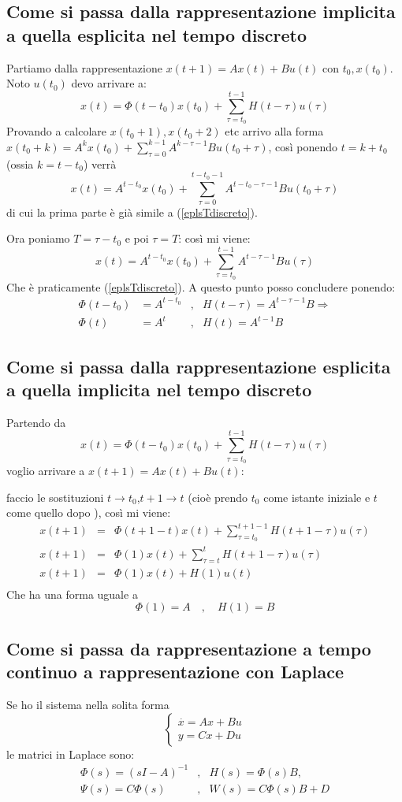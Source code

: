 \documentclass{article}
\begin{document}
\subsection{Come si passa dalla rappresentazione implicita a quella esplicita nel tempo discreto}
Partiamo dalla rappresentazione $x(t+1) = Ax(t)+Bu(t)$ con $t_0,x(t_0)$.
Noto $u(t_0)$ devo arrivare a: 
\begin{equation}\label{eplsTdiscreto}
    x(t) = \Phi(t-t_0)x(t_0)+\sum_{\tau=t_0}^{t-1}H(t-\tau)u(\tau)
\end{equation}
Provando a calcolare $x(t_0+1),x(t_0+2)$ etc arrivo alla forma
$x(t_0+k) = A^kx(t_0)+\sum_{\tau = 0}^{k-1}A^{k-\tau-1}B u(t_0+\tau)$,
così ponendo $t=k+t_0$ (ossia $k=t-t_0$) verrà
\[
x(t) =A^{t-t_0}x(t_0) +\sum_{\tau=0}^{t-t_0-1}A^{t-t_0-\tau-1}B u(t_0+\tau)   
\]
di cui la prima parte è già simile a (\ref{eplsTdiscreto}).

Ora poniamo $T = \tau-t_0$ e poi $\tau=T$: così mi viene:
\[
    x(t) =A^{t-t_0}x(t_0)+\sum_{\tau=t_0}^{t-1}A^{t-\tau-1}Bu(\tau)
\]
Che è praticamente (\ref{eplsTdiscreto}). A questo punto posso concludere ponendo:
\begin{align*}
\Phi(t-t_0)&=A^{t-t_0} &,& H(t-\tau) = A^{t-\tau-1}B \Longrightarrow\\
\Phi(t) &= A^t &,&H(t)= A^{t-1}B
\end{align*}


\subsection{Come si passa dalla rappresentazione esplicita a quella implicita nel tempo discreto}

Partendo da
\[
    x(t) = \Phi(t-t_0)x(t_0)+\sum_{\tau=t_0}^{t-1}H(t-\tau)u(\tau)
\]
voglio arrivare a $x(t+1) = Ax(t)+Bu(t)$: 

faccio le sostituzioni $t\to t_0$,$t+1\to t$ (cioè prendo $t_0$ come istante iniziale e $t$ come quello dopo ),
così mi viene:
\begin{align*}
    x(t+1) &=& \Phi(t+1-t)x(t)+\sum_{\tau=t_0}^{t+1-1}H(t+1-\tau)u(\tau)\\
    x(t+1) &=& \Phi(1)x(t)+\sum_{\tau=t}^{t}H(t+1-\tau)u(\tau)\\
    x(t+1) &=& \Phi(1)x(t) +H(1)u(t)\\
\end{align*}
Che ha una forma uguale a
\[\Phi(1) =A \quad,\quad H(1)=B\]



\subsection{Come si passa da rappresentazione a tempo continuo a rappresentazione con Laplace}
Se ho il sistema nella solita forma
\[\begin{cases}\overset{\cdot}{x} = Ax+Bu\\y = Cx+Du \end{cases}\]
le matrici in Laplace sono:
\begin{align*}
     \Phi(s) = (sI-A)^{-1}&,&  H(s) = \Phi(s)B,\\
     \Psi(s) = C \Phi(s)&,& W(s)=C\Phi(s)B+D 
\end{align*}
\end{document}
